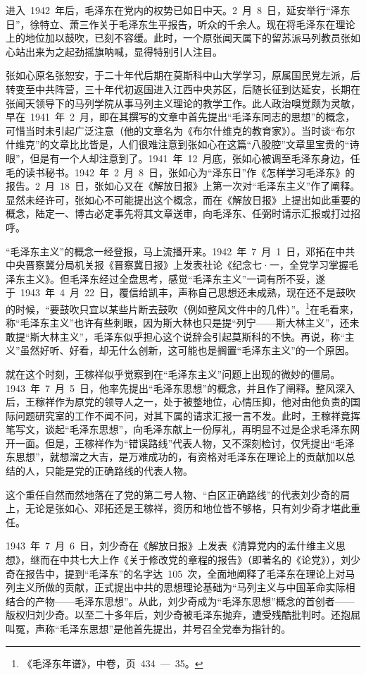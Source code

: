 进入~1942~年后，毛泽东在党内的权势已如日中天。2~月~8~日，延安举行“泽东日”，徐特立、萧三作关于毛泽东生平报告，听众的千余人。现在将毛泽东在理论上的地位加以鼓吹，已刻不容缓。此时，一个原张闻天属下的留苏派马列教员张如心站出来为之起劲摇旗呐喊，显得特别引人注目。

张如心原名张恕安，于二十年代后期在莫斯科中山大学学习，原属国民党左派，后转变至中共阵营，三十年代初返国进入江西中央苏区，后随长征到达延安，长期在张闻天领导下的马列学院从事马列主义理论的教学工作。此人政治嗅觉颇为灵敏，早在~1941~年~2~月，即在其撰写的文章中首先提出“毛泽东同志的思想”的概念，可惜当时未引起广泛注意（他的文章名为《布尔什维克的教育家》）。当时谈“布尔什维克”的文章比比皆是，人们很难注意到张如心在这篇“八股腔”文章里宝贵的“诗眼”，但是有一个人却注意到了。1941~年~12~月底，张如心被调至毛泽东身边，任毛的读书秘书。1942~年~2~月~8~日，张如心为“泽东日”作《怎样学习毛泽东》的报告。2~月~18~日，张如心又在《解放日报》上第一次对“毛泽东主义”作了阐释。显然未经许可，张如心不可能提出这个概念，而在《解放日报》上提出如此重要的概念，陆定一、博古必定事先将其文章送审，向毛泽东、任弼时请示汇报或打过招呼。

“毛泽东主义”的概念一经登报，马上流播开来。1942~年~7~月~1~日，邓拓在中共中央晋察冀分局机关报《晋察冀日报》上发表社论《纪念七·一，全党学习掌握毛泽东主义》。但毛泽东经过全盘思考，感觉“毛泽东主义”一词有所不妥，遂于~1943~年~4~月~22~日，覆信给凯丰，声称自己思想还未成熟，现在还不是鼓吹的时候，“要鼓吹只宜以某些片断去鼓吹（例如整风文件中的几件）”。\footnote{《毛泽东年谱》，中卷，页~434~—~35。}在毛看来，称“毛泽东主义”也许有些刺眼，因为斯大林也只是提“列宁——斯大林主义”，还未敢提“斯大林主义”，毛泽东似乎担心这个说辞会引起莫斯科的不快。再说，称“主义”虽然好听、好看，却无什么创新，这可能也是搁置“毛泽东主义”的一个原因。

就在这个时刻，王稼祥似乎觉察到在“毛泽东主义”问题上出现的微妙的僵局。1943~年~7~月~5~日，他率先提出“毛泽东思想”的概念，并且作了阐释。整风深入后，王稼祥作为原党的领导人之一，处于被整地位，心情压抑，他对由他负责的国际问题研究室的工作不闻不问，对其下属的请求汇报一言不发。此时，王稼祥竟挥笔写文，谈起“毛泽东思想”，向毛泽东献上一份厚礼，再明显不过是企求毛泽东网开一面。但是，王稼祥作为“错误路线”代表人物，又不深刻检讨，仅凭提出“毛泽东思想”，就想溜之大吉，是万难成功的，有资格对毛泽东在理论上的贡献加以总结的人，只能是党的正确路线的代表人物。

这个重任自然而然地落在了党的第二号人物、“白区正确路线”的代表刘少奇的肩上，无论是张如心、邓拓还是王稼祥，资历和地位皆不够格，只有刘少奇才堪此重任。

1943~年~7~月~6~日，刘少奇在《解放日报》上发表《清算党内的孟什维主义思想》，继而在中共七大上作《关于修改党的章程的报告》（即著名的《论党》），刘少奇在报告中，提到“毛泽东”的名字达~105~次，全面地阐释了毛泽东在理论上对马列主义所做的贡献，正式提出中共的思想理论基础为“马列主义与中国革命实际相结合的产物——毛泽东思想”。从此，刘少奇成为“毛泽东思想”概念的首创者——版权归刘少奇。以至二十多年后，刘少奇被毛泽东抛弃，遭受残酷批判时。还抱屈叫冤，声称“毛泽东思想”是他首先提出，并号召全党奉为指针的。


